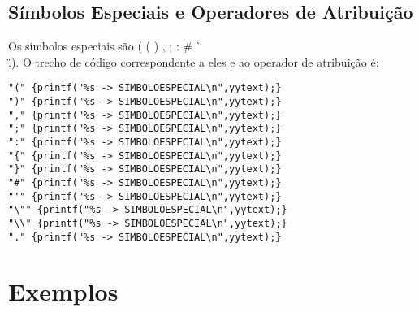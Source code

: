 \documentclass[a4paper,10pt]{article}
\begin{document}
  \subsection{Símbolos Especiais e Operadores de Atribuição}
  Os símbolos especiais são ( ( ) , ; : { } # ' \\ \" .). O trecho de código correspondente a eles e ao operador de atribuição é:
  \begin{verbatim}
"(" {printf("%s -> SIMBOLOESPECIAL\n",yytext);}
")" {printf("%s -> SIMBOLOESPECIAL\n",yytext);}
"," {printf("%s -> SIMBOLOESPECIAL\n",yytext);}
";" {printf("%s -> SIMBOLOESPECIAL\n",yytext);}
":" {printf("%s -> SIMBOLOESPECIAL\n",yytext);}
"{" {printf("%s -> SIMBOLOESPECIAL\n",yytext);}
"}" {printf("%s -> SIMBOLOESPECIAL\n",yytext);}
"#" {printf("%s -> SIMBOLOESPECIAL\n",yytext);}
"'" {printf("%s -> SIMBOLOESPECIAL\n",yytext);}
"\"" {printf("%s -> SIMBOLOESPECIAL\n",yytext);}
"\\" {printf("%s -> SIMBOLOESPECIAL\n",yytext);}
"." {printf("%s -> SIMBOLOESPECIAL\n",yytext);}
  \end{verbatim}


\section{Exemplos}
\end{document}
